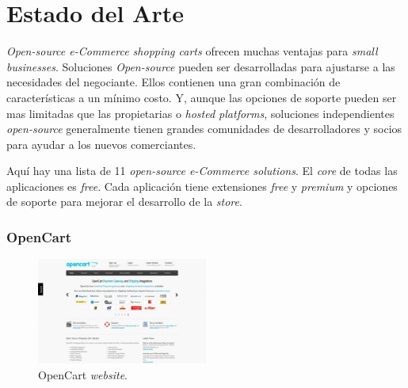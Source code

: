 \chapter{Estado del Arte}\label{cap:estadoArte}

%
%



\textit{Open-source e-Commerce shopping carts} ofrecen muchas ventajas para \textit{small businesses}. Soluciones \textit{Open-source} pueden ser desarrolladas para ajustarse a las necesidades del negociante. Ellos contienen una gran combinación de características a un mínimo costo. Y, aunque las opciones de soporte pueden ser mas limitadas que las propietarias o \textit{hosted platforms}, soluciones independientes \textit{open-source} generalmente tienen grandes comunidades de desarrolladores y socios para ayudar a los nuevos comerciantes.

Aquí hay una lista de 11 \textit{open-source e-Commerce solutions}. El \textit{core} de todas las aplicaciones es \textit{free}. Cada aplicación tiene extensiones \textit{free} y \textit{premium} y opciones de soporte para mejorar el desarrollo de la \textit{store}.

\newcommand{\nameOpenCart}{OpenCart }
\subsection{\nameOpenCart}

\begin{figure}[h!]
	\centering
	\includegraphics[width=0.5\textwidth]{figuras/cap1/openCartWebsite.jpg}
	\caption{\nameOpenCart \textit{website}\cite{online_OpenCartWebsite}.}
\end{figure}

